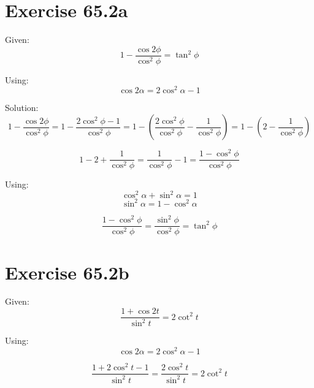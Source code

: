 \documentclass[a4paper, 10pt]{scrartcl}
\begin{document}
\section{Exercise 65.2a}

Given:
\[1 - \frac{\cos{2\phi}}{\cos^{2}{\phi}} = \tan^{2}{\phi}\]

Using:
\[\cos{2\alpha} = 2\cos^{2}{\alpha} - 1\]

Solution:
\[1 - \frac{\cos{2\phi}}{\cos^{2}{\phi}} = 1 - \frac{2\cos^{2}{\phi} - 1}{\cos^{2}{\phi}} =
1 - \left(\frac{2\cos^{2}{\phi}}{\cos^{2}{\phi}} - \frac{1}{\cos^{2}{\phi}}\right) =
1 - (2 - \frac{1}{\cos^{2}{\phi}})\]

\[1 - 2 + \frac{1}{\cos^{2}{\phi}} =
\frac{1}{\cos^{2}{\phi}} - 1 =
\frac{1 - \cos^{2}{\phi}}{\cos^{2}{\phi}}\]

Using:
\[\cos^{2}{\alpha} + \sin^{2}{\alpha} = 1\]
\[\sin^{2}{\alpha} = 1 - \cos^{2}{\alpha}\]

\[\frac{1 - \cos^{2}{\phi}}{\cos^{2}{\phi}} = \frac{\sin^{2}{\phi}}{\cos^{2}{\phi}} =
\tan^{2}{\phi}\]

\section{Exercise 65.2b}

Given:
\[\frac{1 + \cos{2t}}{\sin^{2}{t}} = 2\cot^{2}{t}\]

Using:
\[\cos{2\alpha} = 2\cos^{2}{\alpha} - 1\]

\[\frac{1 + 2\cos^{2}{t} - 1}{\sin^{2}{t}} = \frac{2\cos^{2}{t}}{\sin^{2}{t}} = 2\cot^{2}{t}\]
\end{document}
